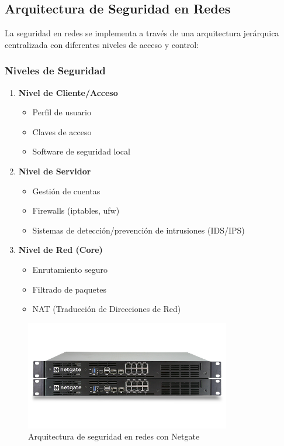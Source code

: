 \documentclass[12pt,a4paper]{article}
\begin{document}
\subsection{Arquitectura de Seguridad en Redes}
La seguridad en redes se implementa a través de una arquitectura jerárquica centralizada con diferentes niveles de acceso y control:

\subsubsection{Niveles de Seguridad}
\begin{enumerate}
    \item \textbf{Nivel de Cliente/Acceso}
    \begin{itemize}
        \item Perfil de usuario
        \item Claves de acceso
        \item Software de seguridad local
    \end{itemize}
    
    \item \textbf{Nivel de Servidor}
    \begin{itemize}
        \item Gestión de cuentas
        \item Firewalls (iptables, ufw)
        \item Sistemas de detección/prevención de intrusiones (IDS/IPS)
    \end{itemize}
    
    \item \textbf{Nivel de Red (Core)}
    \begin{itemize}
        \item Enrutamiento seguro
        \item Filtrado de paquetes
        \item NAT (Traducción de Direcciones de Red)
    \end{itemize}
\end{enumerate}

\begin{figure}[H]
    \centering
    \includegraphics[width=0.8\textwidth]{netgate.png}
    \caption{Arquitectura de seguridad en redes con Netgate}
    \label{fig:netgate}
\end{figure}
\end{document}
